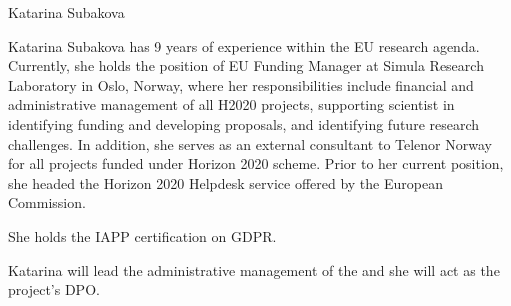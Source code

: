 \begin{participant}[type=PM,PM=24,gender=female]{Katarina Subakova}


Katarina Subakova has 9 years of experience within the EU research agenda. Currently, she holds the position of EU Funding Manager at Simula Research Laboratory in Oslo, Norway, where her responsibilities include financial and administrative management of all H2020 projects, supporting scientist in identifying funding and developing proposals, and identifying future research challenges. In addition, she serves as an external consultant to Telenor Norway for all projects funded under Horizon 2020 scheme. Prior to her current position, she headed the Horizon 2020 Helpdesk service offered by the European Commission. 

She holds the IAPP certification on GDPR. 

Katarina will lead the administrative management of the \TheProject and she will act as the project's DPO.

\end{participant}

